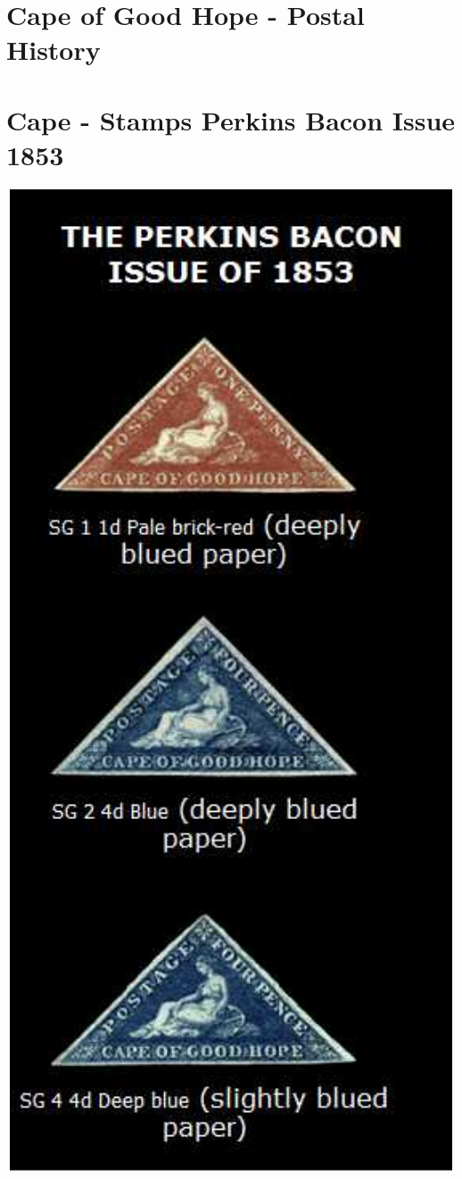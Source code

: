 
\chapter{Cape of Good Hope - Postal History 
} 
\chapter{Cape - Stamps Perkins Bacon Issue 1853
} 
\begin{marginfigure}
\includegraphics[width=1.0\textwidth]{../cape-of-good-hope/bacon.jpg}
\end{marginfigure}
  	 
